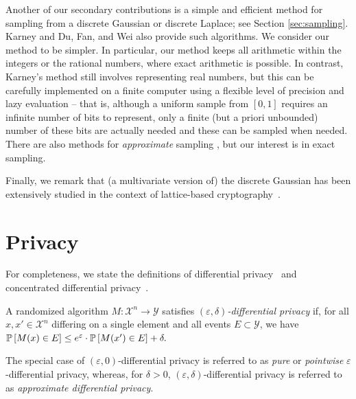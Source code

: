 \documentclass{jpcfinal} %
\newcommand{\pr}[2]{{\ifx&#1& \mathbb{P} \else
\underset{#1}{\mathbb{P}} \fi \left[#2\right]}}
\newcommand{\eps}{\varepsilon}
\begin{document}
Another of our secondary contributions is a simple and efficient method for sampling from a discrete Gaussian or discrete Laplace; see Section \ref{sec:sampling}. Karney \cite{Karney16} and Du, Fan, and Wei \cite{DuFW20} also provide such algorithms. We consider our method to be simpler. In particular, our method keeps all arithmetic within the integers or the rational numbers, where exact arithmetic is possible. In contrast, Karney's method still involves representing real numbers, but this can be carefully implemented on a finite computer using a flexible level of precision and lazy evaluation -- that is, although a uniform sample from $[0,1]$ requires an infinite number of bits to represent, only a finite (but a priori unbounded) number of these bits are actually needed and these can be sampled when needed. There are also methods for \emph{approximate} sampling \citep{ZhaoSS19}, but our interest is in exact sampling.

Finally, we remark that (a multivariate version of) the discrete Gaussian has been extensively studied in the context of lattice-based cryptography~\cite[etc.]{GentryPV08,Regev09,Peikert10,Stephens-Davidowitz17}.

\section{Privacy}
\label{sec:privacy}
For completeness, we state the definitions of differential privacy~\citep{DworkMNS06,DworkKMMN06} and concentrated differential privacy~\citep{DworkR16,BunS16}.
\begin{defi}
A randomized algorithm $M\colon \mathcal{X}^n \to \mathcal{Y}$ satisfies \emph{$(\eps,\delta)$-differential privacy} if, for all $x,x'\in\mathcal{X}^n$ differing on a single element and all events $E \subset \mathcal{Y}$, we have $\pr{}{M(x) \in E} \le e^\eps \cdot \pr{}{M(x') \in E} + \delta.$
\end{defi}
The special case of $(\eps,0)$-differential privacy is referred to as \emph{pure} or \emph{pointwise} $\eps$-differential privacy, whereas, for $\delta>0$, $(\eps,\delta)$-differential privacy is referred to as \emph{approximate differential privacy}.
\end{document}
